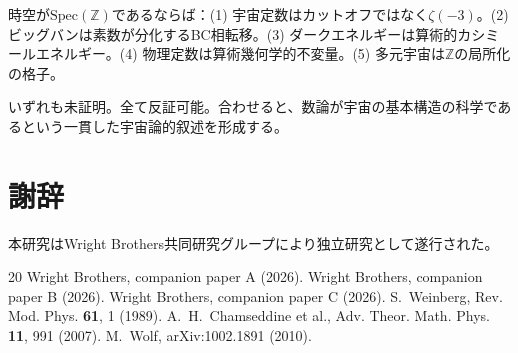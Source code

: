 \documentclass[11pt,a4paper]{article}
\newcommand{\Spec}{\mathrm{Spec}}
\begin{document}
時空が$\Spec(\mathbb{Z})$であるならば：(1) 宇宙定数はカットオフではなく$\zeta(-3)$。(2) ビッグバンは素数が分化するBC相転移。(3) ダークエネルギーは算術的カシミールエネルギー。(4) 物理定数は算術幾何学的不変量。(5) 多元宇宙は$\mathbb{Z}$の局所化の格子。

いずれも未証明。全て反証可能。合わせると、数論が宇宙の基本構造の科学であるという一貫した宇宙論的叙述を形成する。

\section*{謝辞}
本研究はWright Brothers共同研究グループにより独立研究として遂行された。

\begin{thebibliography}{20}
 Wright Brothers, companion paper A (2026).
 Wright Brothers, companion paper B (2026).
 Wright Brothers, companion paper C (2026).
 S.~Weinberg, Rev. Mod. Phys. \textbf{61}, 1 (1989).
 A.~H.~Chamseddine et al., Adv. Theor. Math. Phys. \textbf{11}, 991 (2007).
 M.~Wolf, arXiv:1002.1891 (2010).
\end{thebibliography}
\end{document}
